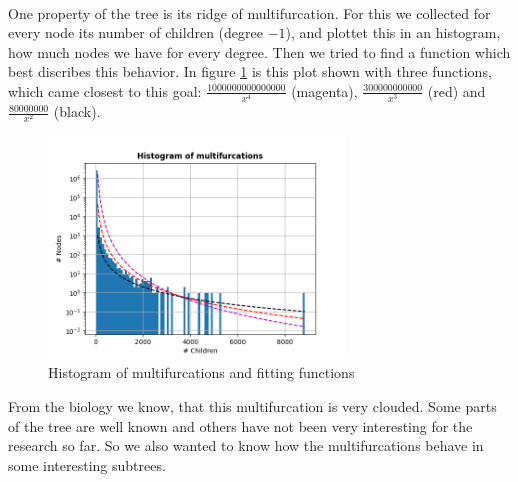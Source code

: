        \\
      One property of the tree is its ridge of multifurcation. For this we collected for every node its
        number of children (degree $-1$), and plottet this in an histogram, how much nodes we have for 
        every degree. Then we tried to find a function which best discribes this behavior. In figure 
        \ref{fig:HistogramsOfMultifurcations} is this plot shown with three functions, which came 
        closest to this goal: $\frac{1000000000000000}{x^4}$ (magenta), 
        $\frac{300000000000}{x^3}$ (red) and $\frac{80000000}{x^2}$ (black). \\
      \begin{figure}[h]
        \caption{Histogram of multifurcations and fitting functions}
        \centering
        \label{fig:HistogramsOfMultifurcations}
        \includegraphics[width=0.7\textwidth]{Figures/HistogramsOfMultifurcations.png}
      \end{figure}
      From the biology we know, that this multifurcation is very clouded. Some parts of the tree are 
        well known and others have not been very interesting for the research so far. So we also wanted 
        to know how the multifurcations behave in some interesting subtrees. \\
       \\
       \\
       \\

